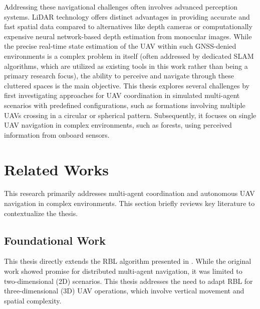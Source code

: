 Addressing these navigational challenges often involves advanced perception systems. 
\ac{LiDAR} technology offers distinct advantages in providing accurate and fast spatial data compared to alternatives like depth cameras or computationally expensive neural network-based depth estimation from monocular images. 
While the precise real-time state estimation of the \ac{UAV} within such \ac{GNSS}-denied environments is a complex problem in itself (often addressed by dedicated \ac{SLAM} algorithms, which are utilized as existing tools in this work rather than being a primary research focus), the ability to perceive and navigate through these cluttered spaces is the main objective. 
This thesis explores several challenges by first investigating approaches for \ac{UAV} coordination in simulated multi-agent scenarios with predefined configurations, such as formations involving multiple \ac{UAV}s crossing in a circular or spherical pattern. 
Subsequently, it focuses on single \ac{UAV} navigation in complex environments, such as forests, using perceived information from onboard sensors.

\section{Related Works}

  This research primarily addresses multi-agent coordination and autonomous UAV navigation in complex environments. 
  This section briefly reviews key literature to contextualize the thesis.
  \subsection{Foundational Work}
    This thesis directly extends the \ac{RBL} algorithm presented in \cite{rbl_paper}. 
    While the original work showed promise for distributed multi-agent navigation, it was limited to two-dimensional (2D) scenarios. 
    This thesis addresses the need to adapt \ac{RBL} for three-dimensional (3D) \ac{UAV} operations, which involve vertical movement and spatial complexity.

